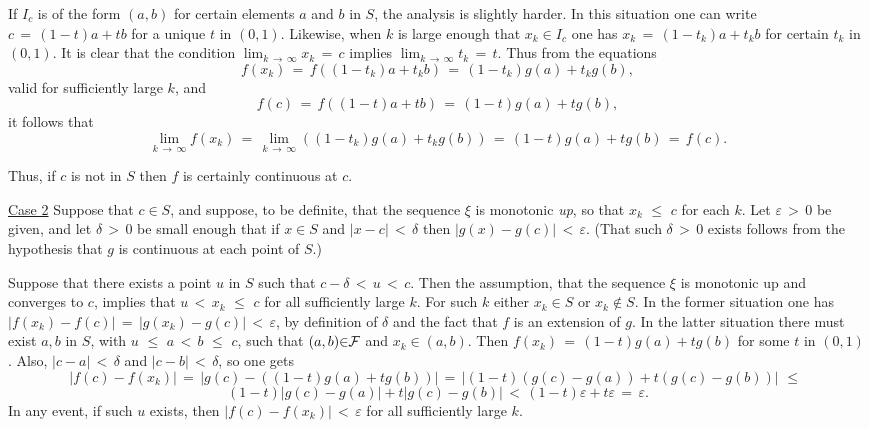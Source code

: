         If $I_{c}$ is of the form $(a,b)$ for certain elements $a$ and $b$ in $S$, the analysis is slightly harder.
    In this situation one can write $c \,=\, (1-t)a+tb$ for a unique $t$ in $(0,1)$.
    Likewise, when $k$ is large enough that $x_{k}{\in}I_{c}$ one has $x_{k} \,=\, (1-t_{k})a+t_{k}b$ for certain $t_{k}$ in $(0,1)$.
    It is clear that the condition $\lim_{k \,{\rightarrow}\, {\infty}} x_{k} \,=\, c$ implies $\lim_{k \,{\rightarrow}\, {\infty}} t_{k} \,=\, t$.
    Thus from the equations
        \begin{displaymath}
        f(x_{k}) \,=\, f((1-t_{k})a + t_{k}b) \,=\, (1-t_{k})g(a) + t_{k}g(b),
        \end{displaymath}
    valid for sufficiently large $k$, and
        \begin{displaymath}
        f(c) \,=\, f((1-t)a+tb) \,=\, (1-t)g(a)+tg(b),
        \end{displaymath}
    it follows that
        \begin{displaymath}
        \lim_{k \,{\rightarrow}\, {\infty}} f(x_{k}) \,=\, \lim_{k \,{\rightarrow}\, {\infty}} ((1-t_{k})g(a) + t_{k}g(b)) \,=\, (1-t)g(a)+tg(b) \,=\, f(c).
        \end{displaymath}

        Thus, if $c$ is not in $S$ then $f$ is certainly continuous at $c$.

\V

        \underline{Case 2} Suppose that $c{\in}S$, and suppose, to be definite, that the sequence ${\xi}$ is monotonic {\em up}, so that $x_{k}\,\,{\leq}\,\,c$ for each $k$.
    Let ${\varepsilon}\,>\,0$ be given, and let ${\delta}\,>\,0$ be small enough that if $x{\in}S$ and $|x-c|\,<\,{\delta}$ then $|g(x)-g(c)|\,<\,{\varepsilon}$.
    (That such ${\delta}\,>\,0$ exists follows from the hypothesis that $g$ is continuous at each point of $S$.)

        Suppose that there exists a point $u$ in $S$ such that $c-{\delta}\,<\,u\,<\,c$.
    Then the assumption, that the sequence ${\xi}$ is monotonic up and converges to $c$, implies that $u\,<\,x_{k}\,\,{\leq}\,\,c$ for all sufficiently large $k$.
    For such $k$ either $x_{k}{\in}S$ or $x_{k} \not \in S$.
    In the former situation one has $|f(x_{k})-f(c)| \,=\, |g(x_{k})-g(c)|\,<\,{\varepsilon}$, by definition of ${\delta}$ and the fact that $f$ is an extension of $g$.
    In the latter situation there must exist $a,b$ in $S$, with $u\,\,{\leq}\,\,a \,<\,b\,\,{\leq}\,\,c$, such that $(a,b){\in}{\cal F}$ and $x_{k}{\in}(a,b)$.
    Then $f(x_{k}) \,=\, (1-t)g(a)+tg(b)$ for some $t$ in $(0,1)$. Also, $|c-a|\,<\,{\delta}$ and $|c-b|\,<\,{\delta}$, so one gets
        \begin{displaymath}
        |f(c)-f(x_{k})| \,=\, |g(c)-((1-t)g(a)+tg(b))| \,=\, |(1-t)(g(c)-g(a)) + t(g(c)-g(b))|\,\,{\leq}\,\,
        \end{displaymath}
        \begin{displaymath}
    (1-t)|g(c)-g(a)| + t|g(c)-g(b)|\,<\,(1-t){\varepsilon}+t{\varepsilon} \,=\, {\varepsilon}.
        \end{displaymath}
    In any event, if such $u$ exists, then $|f(c)-f(x_{k})|\,<\,{\varepsilon}$ for all sufficiently large $k$.

